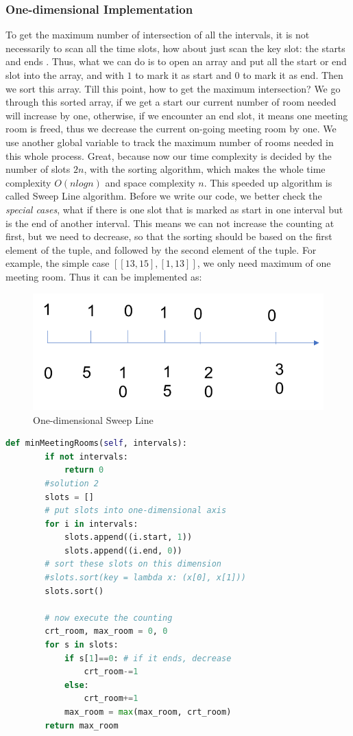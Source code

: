 \documentclass[../../main.tex]{subfiles}
\begin{document}
\subsubsection{One-dimensional Implementation}
 To get the maximum number of intersection of all the intervals, it is not necessarily to scan all the time slots, how about just scan the key slot: the starts and ends . Thus, what we can do is to open an array and put all the start or end slot into the array, and with $1$ to mark it as start and $0$ to mark it as end. Then we sort this array. Till this point, how to get the maximum intersection? We go through this sorted array, if we get a start our current number of room needed will increase by one, otherwise, if we encounter an end slot, it means one meeting room is freed, thus we decrease the current on-going meeting room by one. We use another global variable to track the maximum number of rooms needed in this whole process. Great, because now our time complexity is decided by the number of slots $2n$, with the sorting algorithm, which makes the whole time complexity $O(nlogn)$ and space complexity $n$. This speeded up algorithm is called Sweep Line algorithm. Before we write our code, we better check the \textit{special cases}, what if there is one slot that is marked as start in one interval but is the end of another interval. This means we can not increase the counting at first, but we need to decrease, so that the sorting should be based on the first element of the tuple, and followed by the second element of the tuple. For example, the simple case $[[13,15],[1,13]]$, we only need maximum of one meeting room. Thus it can be implemented as:
\begin{figure}[h]
    \centering
    \includegraphics[width=0.6\columnwidth]{fig/sweep_line_one_dimension.png}
    \caption{One-dimensional Sweep Line}
    \label{fig:one_dim_sl}
\end{figure}
\begin{lstlisting}[language=Python]
 def minMeetingRooms(self, intervals):
        if not intervals:
            return 0       
        #solution 2
        slots = []
        # put slots into one-dimensional axis
        for i in intervals:
            slots.append((i.start, 1))
            slots.append((i.end, 0))
        # sort these slots on this dimension
        #slots.sort(key = lambda x: (x[0], x[1]))
        slots.sort()
        
        # now execute the counting
        crt_room, max_room = 0, 0
        for s in slots:
            if s[1]==0: # if it ends, decrease
                crt_room-=1
            else:
                crt_room+=1
            max_room = max(max_room, crt_room)
        return max_room
\end{lstlisting}
\end{document}
